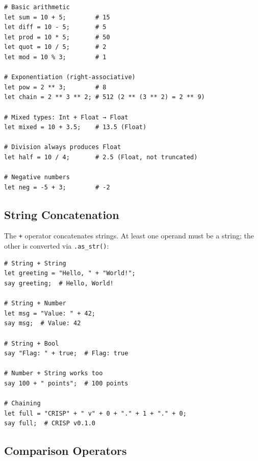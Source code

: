 \begin{tcolorbox}[colback=codebg, colframe=darkpurple, colbacktitle=darkpurple, title=\textbf{\textcolor{codegold}{Arithmetic Operators}}, fonttitle=\bfseries, sharp corners]
\begin{lstlisting}
# Basic arithmetic
let sum = 10 + 5;        # 15
let diff = 10 - 5;       # 5
let prod = 10 * 5;       # 50
let quot = 10 / 5;       # 2
let mod = 10 % 3;        # 1

# Exponentiation (right-associative)
let pow = 2 ** 3;        # 8
let chain = 2 ** 3 ** 2; # 512 (2 ** (3 ** 2) = 2 ** 9)

# Mixed types: Int + Float → Float
let mixed = 10 + 3.5;    # 13.5 (Float)

# Division always produces Float
let half = 10 / 4;       # 2.5 (Float, not truncated)

# Negative numbers
let neg = -5 + 3;        # -2
\end{lstlisting}
\end{tcolorbox}

\subsection{String Concatenation}

The \texttt{+} operator concatenates strings. At least one operand must be a string; the other is converted via \texttt{.as\_str()}:

\begin{tcolorbox}[colback=codebg, colframe=darkpurple, colbacktitle=darkpurple, title=\textbf{\textcolor{codegold}{String Concatenation}}, fonttitle=\bfseries, sharp corners]
\begin{lstlisting}
# String + String
let greeting = "Hello, " + "World!";
say greeting;  # Hello, World!

# String + Number
let msg = "Value: " + 42;
say msg;  # Value: 42

# String + Bool
say "Flag: " + true;  # Flag: true

# Number + String works too
say 100 + " points";  # 100 points

# Chaining
let full = "CRISP" + " v" + 0 + "." + 1 + "." + 0;
say full;  # CRISP v0.1.0
\end{lstlisting}
\end{tcolorbox}

\subsection{Comparison Operators}

